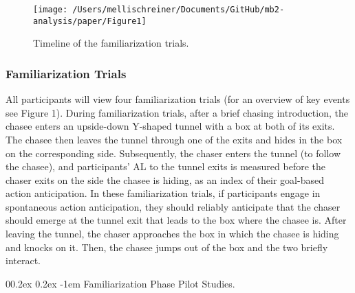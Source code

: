 \documentclass[
  english,
  man,floatsintext]{apa6}
\makeatletter
\let\oldparagraph\paragraph
\renewcommand{\paragraph}[1]{\oldparagraph{#1}\mbox{}}
\renewcommand{\paragraph}{\@startsection{paragraph}{4}{\parindent}%
  {0\baselineskip \@plus 0.2ex \@minus 0.2ex}%
  {-1em}%
  {\normalfont\normalsize\bfseries\itshape\typesectitle}}
\makeatother
\begin{document}
\begin{figure}

{\centering \texttt{[image: /Users/mellischreiner/Documents/GitHub/mb2-analysis/paper/Figure1]} 

}

\caption{Timeline of the familiarization trials.}\label{fig:fig1}
\end{figure}

\hypertarget{familiarization-trials}{%
\subsubsection{Familiarization Trials}\label{familiarization-trials}}

All participants will view four familiarization trials (for an overview of key events see Figure 1). During familiarization trials, after a brief chasing introduction, the chasee enters an upside-down Y-shaped tunnel with a box at both of its exits. The chasee then leaves the tunnel through one of the exits and hides in the box on the corresponding side. Subsequently, the chaser enters the tunnel (to follow the chasee), and participants' AL to the tunnel exits is measured before the chaser exits on the side the chasee is hiding, as an index of their goal-based action anticipation. In these familiarization trials, if participants engage in spontaneous action anticipation, they should reliably anticipate that the chaser should emerge at the tunnel exit that leads to the box where the chasee is. After leaving the tunnel, the chaser approaches the box in which the chasee is hiding and knocks on it. Then, the chasee jumps out of the box and the two briefly interact.

\hypertarget{familiarization-phase-pilot-studies.}{%
\paragraph{Familiarization Phase Pilot Studies.}\label{familiarization-phase-pilot-studies.}}
\end{document}
